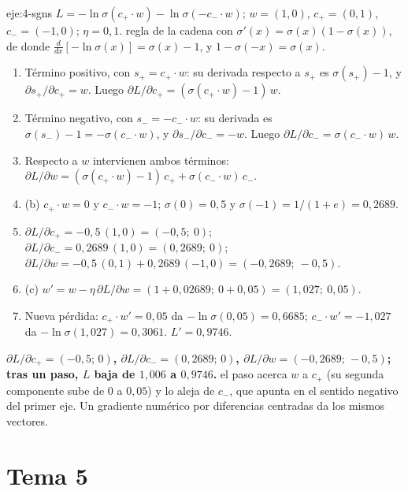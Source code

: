 \begin{solucion}{eje:4-sgns}
\datos $L=-\ln\sigma(c_{+}\cdot w)-\ln\sigma(-c_{-}\cdot w)$; $w=(1,0)$, $c_{+}=(0,1)$, $c_{-}=(-1,0)$; $\eta=0{,}1$.
\planteamiento regla de la cadena con $\sigma'(x)=\sigma(x)(1-\sigma(x))$, de donde $\frac{d}{dx}[-\ln\sigma(x)]=\sigma(x)-1$, y $1-\sigma(-x)=\sigma(x)$.
\pasos
\begin{enumerate}[label=\arabic*.]
  \item Término positivo, con $s_{+}=c_{+}\cdot w$: su derivada respecto a $s_{+}$ es $\sigma(s_{+})-1$, y $\partial s_{+}/\partial c_{+}=w$. Luego $\partial L/\partial c_{+}=(\sigma(c_{+}\cdot w)-1)\,w$.
  \item Término negativo, con $s_{-}=-c_{-}\cdot w$: su derivada es $\sigma(s_{-})-1=-\sigma(c_{-}\cdot w)$, y $\partial s_{-}/\partial c_{-}=-w$. Luego $\partial L/\partial c_{-}=\sigma(c_{-}\cdot w)\,w$.
  \item Respecto a $w$ intervienen ambos términos: $\partial L/\partial w=(\sigma(c_{+}\cdot w)-1)\,c_{+}+\sigma(c_{-}\cdot w)\,c_{-}$.
  \item (b) $c_{+}\cdot w=0$ y $c_{-}\cdot w=-1$; $\sigma(0)=0{,}5$ y $\sigma(-1)=1/(1+e)=0{,}2689$.
  \item $\partial L/\partial c_{+}=-0{,}5\,(1,0)=(-0{,}5;\ 0)$; $\partial L/\partial c_{-}=0{,}2689\,(1,0)=(0{,}2689;\ 0)$; $\partial L/\partial w=-0{,}5\,(0,1)+0{,}2689\,(-1,0)=(-0{,}2689;\ -0{,}5)$.
  \item (c) $w'=w-\eta\,\partial L/\partial w=(1+0{,}02689;\ 0+0{,}05)=(1{,}027;\ 0{,}05)$.
  \item Nueva pérdida: $c_{+}\cdot w'=0{,}05$ da $-\ln\sigma(0{,}05)=0{,}6685$; $c_{-}\cdot w'=-1{,}027$ da $-\ln\sigma(1{,}027)=0{,}3061$. $L'=0{,}9746$.
\end{enumerate}
\resultado \textbf{$\partial L/\partial c_{+}=(-0{,}5;\,0)$, $\partial L/\partial c_{-}=(0{,}2689;\,0)$, $\partial L/\partial w=(-0{,}2689;\,-0{,}5)$; tras un paso, $L$ baja de $1{,}006$ a $0{,}9746$.}
\comprobacion el paso acerca $w$ a $c_{+}$ (su segunda componente sube de 0 a $0{,}05$) y lo aleja de $c_{-}$, que apunta en el sentido negativo del primer eje. Un gradiente numérico por diferencias centradas da los mismos vectores.
\end{solucion}

\section{Tema 5}

